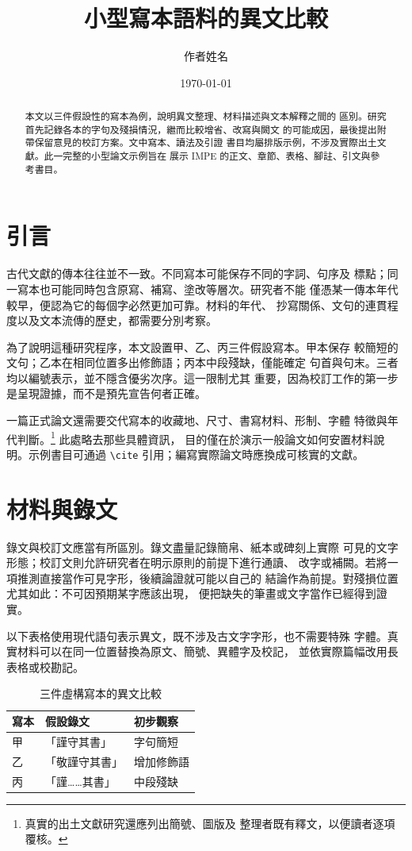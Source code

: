 \documentclass[lang=zh]{impeart}
\title{小型寫本語料的異文比較}
\author{作者姓名}
\date{\today}
\begin{document}
\maketitle
\begin{abstract}
本文以三件假設性的寫本為例，說明異文整理、材料描述與文本解釋之間的
區別。研究首先記錄各本的字句及殘損情況，繼而比較增省、改寫與闕文
的可能成因，最後提出附帶保留意見的校訂方案。文中寫本、讀法及引證
書目均屬排版示例，不涉及實際出土文獻。此一完整的小型論文示例旨在
展示 IMPE 的正文、章節、表格、腳註、引文與參考書目。
\end{abstract}

\section{引言}\label{sec:intro}
古代文獻的傳本往往並不一致。不同寫本可能保存不同的字詞、句序及
標點；同一寫本也可能同時包含原寫、補寫、塗改等層次。研究者不能
僅憑某一傳本年代較早，便認為它的每個字必然更加可靠。材料的年代、
抄寫關係、文句的連貫程度以及文本流傳的歷史，都需要分別考察。

為了說明這種研究程序，本文設置甲、乙、丙三件假設寫本。甲本保存
較簡短的文句；乙本在相同位置多出修飾語；丙本中段殘缺，僅能確定
句首與句末。三者均以編號表示，並不隱含優劣次序。這一限制尤其
重要，因為校訂工作的第一步是呈現證據，而不是預先宣告何者正確。

一篇正式論文還需要交代寫本的收藏地、尺寸、書寫材料、形制、字體
特徵與年代判斷。\footnote{真實的出土文獻研究還應列出簡號、圖版及
整理者既有釋文，以便讀者逐項覆核。} 此處略去那些具體資訊，
目的僅在於演示一般論文如何安置材料說明。示例書目可通過
\verb|\cite| 引用\cite{sample2026}；編寫實際論文時應換成可核實的文獻。

\section{材料與錄文}\label{sec:materials}
錄文與校訂文應當有所區別。錄文盡量記錄簡帛、紙本或碑刻上實際
可見的文字形態；校訂文則允許研究者在明示原則的前提下進行通讀、
改字或補闕。若將一項推測直接當作可見字形，後續論證就可能以自己的
結論作為前提。對殘損位置尤其如此：不可因預期某字應該出現，
便把缺失的筆畫或文字當作已經得到證實。

以下表格使用現代語句表示異文，既不涉及古文字字形，也不需要特殊
字體。真實材料可以在同一位置替換為原文、簡號、異體字及校記，
並依實際篇幅改用長表格或校勘記。

\begin{table}[htbp]
  \centering
  \caption{三件虛構寫本的異文比較}\label{tab:variants}
  \begin{tabular}{lll}
    \toprule
    寫本 & 假設錄文 & 初步觀察 \\
    \midrule
    甲 & 「謹守其書」 & 字句簡短 \\
    乙 & 「敬謹守其書」 & 增加修飾語 \\
    丙 & 「謹……其書」 & 中段殘缺 \\
    \bottomrule
  \end{tabular}
\end{table}
\end{document}
